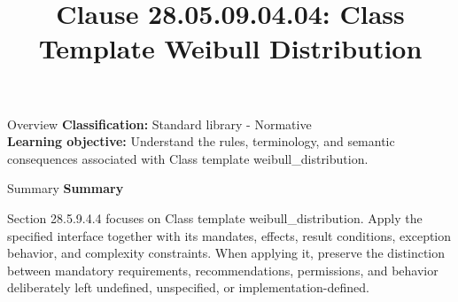 \documentclass[10pt,letterpaper]{article}
\title{Clause 28.05.09.04.04: Class Template Weibull Distribution}
\author{}
\date{}
\begin{document}
\maketitle
\begin{CornellOverviewBox}{Overview}
\textbf{Classification:} Standard library - Normative\\[2pt]
\textbf{Learning objective:} Understand the rules, terminology, and semantic consequences associated with Class template weibull\_distribution.
\end{CornellOverviewBox}\begin{CornellSummaryBox}{Summary}
{\sffamily\bfseries\color{Accent} Summary}\par\vspace{3pt}Section 28.5.9.4.4 focuses on Class template weibull\_distribution. Apply the specified interface together with its mandates, effects, result conditions, exception behavior, and complexity constraints. When applying it, preserve the distinction between mandatory requirements, recommendations, permissions, and behavior deliberately left undefined, unspecified, or implementation-defined.
\end{CornellSummaryBox}
\end{document}
